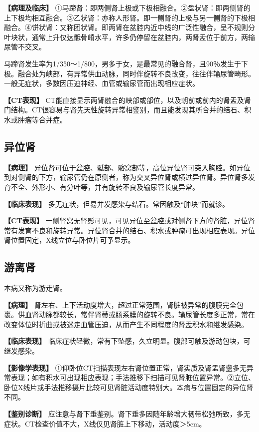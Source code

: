 \textbf{【病理及临床】}
①马蹄肾：即两侧肾上极或下极相融合。②盘状肾：即两侧肾的上下极均相互融合。③乙状肾：亦称人形肾。即一侧肾的上极与另一侧肾的下极相融合。④饼状肾：又称团状肾。即两肾在盆腔内近中线的广泛性融合，呈不规则分叶块状，通常上升仅达骶骨嵴水平，许多仍停留在盆腔内，两肾盂位于前方，两输尿管不交叉。

马蹄肾发生率为1/350～1/800，男多于女，是最常见的融合肾，且90％发生于下极。融合处为峡部，有异常供血动脉，同时伴旋转不良改变，往往伴输尿管畸形。一般无症状，多数因压迫神经、血管或输尿管而出现相应症状。

\textbf{【CT表现】}
CT能直接显示两肾融合的峡部或部位，以及朝前或前内的肾盂及肾门结构。CT很容易与肾先天性旋转异常相鉴别，而且能发现其所合并的结石、积水或肿瘤等合并症。

\subsection{异位肾}

\textbf{【病理】}
异位肾可位于盆腔、骶部、髂窝部等，高位异位肾可突入胸腔。如异位到对侧肾的下方，输尿管仍在原侧者，称为交叉异位肾或横过异位肾。异位肾多发育不全、外形小、有分叶等，并有旋转不良及输尿管长度异常。

\textbf{【临床表现】}
多无症状，但易并发感染与结石。常因触及“肿块”而就诊。

\textbf{【CT表现】}
一侧肾窝无肾影可见，可见异位至盆腔或对侧肾下方的肾脏，异位肾常有发育不良和旋转异常。异位肾合并的结石、积水或肿瘤可出现相应表现。异位肾位置固定，X线立位与卧位片可予显示。

\subsection{游离肾}

本病又称为游走肾。

\textbf{【病理】}
肾左右、上下活动度增大，超过正常范围，肾脏被异常的腹膜完全包裹。供血肾动脉都较长，常伴肾蒂或肠系膜的旋转不良。输尿管长度多正常，常在改变体位时折曲或被迷走血管压迫，从而产生不同程度的肾盂积水和继发感染。

\textbf{【临床表现】}
临床症状轻微，常有下坠感，久立明显。腹部可触及游动包块，可继发感染。

\textbf{【影像学表现】}
①仰卧位CT扫描表现左右肾位置正常，肾实质及肾盂肾盏多无异常表现；如有积水可出现相应表现；手法推移下扫描可见肾脏位置异常。②立位、卧位X线片或手法推移摄片比较可见肾脏活动度特别大。本病与位置固定的异位肾不同。

\textbf{【鉴别诊断】}
应注意与肾下垂鉴别。肾下垂多因随年龄增大韧带松弛所致，多无症状。CT检查价值不大，X线仅见肾脏上下移动，活动度＞5cm。

